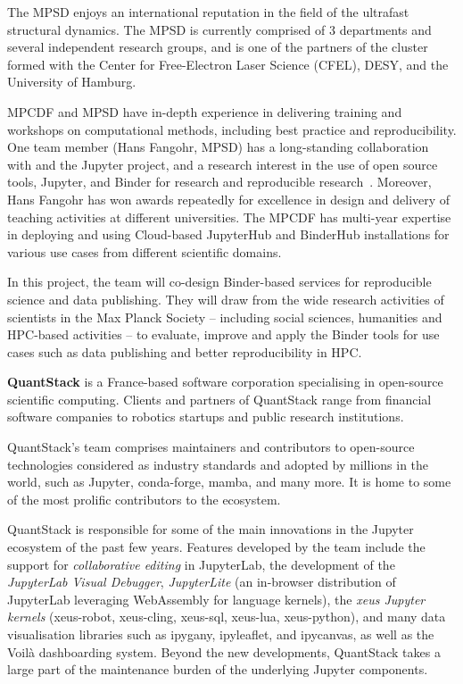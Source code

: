 The MPSD enjoys an international reputation in
the field of the ultrafast structural dynamics. The MPSD is currently comprised
of 3 departments and several independent research groups, and is one of the
partners of the cluster formed with the Center for Free-Electron Laser Science
(CFEL), DESY, and the University of Hamburg.

MPCDF and MPSD have in-depth experience in delivering training and
workshops on computational methods, including best practice and reproducibility.
One team member (Hans Fangohr, MPSD) has a long-standing collaboration with 
and the Jupyter project, and a research interest in the use of open source
tools, Jupyter, and Binder for research and reproducible
research~\cite{Fangohr:ICALEPCS2017-TUCPA01,Fangohr2020,nbval-arxiv,Beg2021}.
Moreover,
Hans Fangohr has won awards repeatedly for excellence in design and delivery of
teaching activities at different universities.
%
The MPCDF has multi-year expertise in deploying and using Cloud-based
JupyterHub and BinderHub installations for various use cases from different
scientific domains.

In this project, the team will co-design Binder-based services for
reproducible science and data publishing. They will draw from the wide research
activities of scientists in the Max Planck Society -- including social sciences,
humanities and HPC-based activities -- to evaluate, improve and apply the Binder
tools for use cases such as data publishing and better reproducibility in HPC.

\medskip \noindent \textbf{QuantStack}
is a France-based software corporation specialising in open-source
scientific computing.
Clients and partners of QuantStack range from financial software companies to robotics
startups and public research institutions.

QuantStack's team comprises maintainers and contributors to open-source technologies
considered as industry standards and adopted by millions in the world, such as Jupyter,
conda-forge, mamba, and many more. It is home to some of the most prolific contributors
to the ecosystem.

QuantStack is responsible for some of the main innovations in the Jupyter ecosystem
of the past few years. Features developed by the team include the support for
\emph{collaborative editing} in JupyterLab, the development of the \emph{JupyterLab Visual Debugger},
\emph{JupyterLite} (an in-browser distribution of JupyterLab leveraging WebAssembly for language kernels),
the \emph{xeus Jupyter kernels} (xeus-robot, xeus-cling, xeus-sql, xeus-lua, xeus-python),
and many data visualisation libraries such as ipygany, ipyleaflet, and ipycanvas,
as well as the Voilà dashboarding system. Beyond the new developments, QuantStack takes
a large part of the maintenance burden of the underlying Jupyter components.


